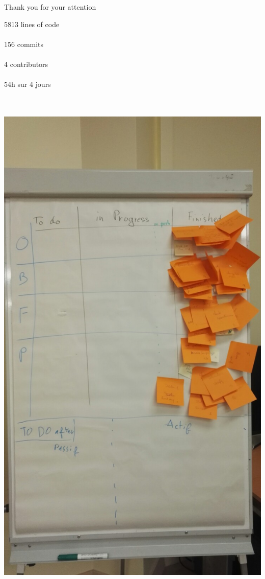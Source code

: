 \documentclass{beamer}
\newcounter{m} %
\newcounter{c} %
\begin{document}
\begin{frame}{Thank you for your attention}
  \begin{minipage}[c][][c]{.5\textwidth}
    5813 lines of code\\~\\156 commits\\~\\4 contributors\\~\\54h sur 4 jours\\~\\~\\\vspace{3cm}
  \end{minipage}\begin{minipage}[t]{.5\textwidth}
    \centering
    \includegraphics[scale=0.15]{board.jpg}
  \end{minipage}

\end{frame}
\end{document}

